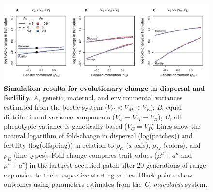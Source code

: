 \documentclass[11pt]{article}
\newcommand{\revise}[1]{{\color{Mahogany}{#1}}}
\begin{document}
\revise{We have focused our analyses on contrasts between invasions with vs. without genetically based trait variation as measures of how evolution affects invasions.
This approach combines evolutionary processes that are unique to spreading populations (spatial sorting) with those that are not (natural selection), and thus represents the `total' effect of evolution.
In Online Appendix A, we present simulation results that isolate the specific influence of spatial sorting from other evolutionary processes. }

\begin{figure}[h!]
\centering
\includegraphics[width=1\linewidth]{Figures/trait_change_revised}
\caption{\textbf{Simulation results for evolutionary change in dispersal and fertility.} 
\textit{A}, genetic, maternal, and environmental variances estimated from the beetle system ($V_{G} < V_{M} < V_{E}$); \textit{B}, equal distribution of variance components ($V_{G} = V_{M} = V_{E}$); \textit{C}, all phenotypic variance is genetically based ($V_{G} = V_{P}$)
Lines show the natural logarithm of fold-change in dispersal (log(patches)) and fertility (log(offspring)) in relation to $\rho_{G}$ (\textit{x}-axis), $\rho_{M}$ (colors), and $\rho_{E}$ (line types).
Fold-change compares trait values ($\mu^{d} + a^{d}$ and $\mu^{r} + a^{r}$) in the farthest occupied patch after 20 generations of range expansion to their respective starting values.
Black points show outcomes using parameters estimates from the \textit{C. maculatus} system.}
\label{corr:traits}
\end{figure}

\end{document}
